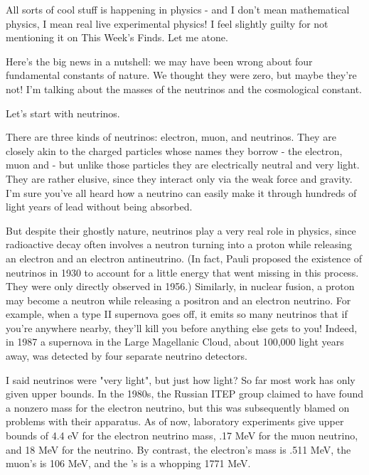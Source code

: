


All sorts of cool stuff is happening in physics - and I don't mean
mathematical physics, I mean real live experimental physics!  I feel
slightly guilty for not mentioning it on This Week's Finds.  Let me
atone.

Here's the big news in a nutshell: we may have been wrong about four
fundamental constants of nature.  We thought they were zero, but maybe
they're not!  I'm talking about the masses of the neutrinos and the
cosmological constant.   

Let's start with neutrinos.

There are three kinds of neutrinos: electron, muon, and \tau  neutrinos.
They are closely akin to the charged particles whose names they borrow -
the electron, muon and \tau  - but unlike those particles they are
electrically neutral and very light.  They are rather elusive, since
they interact only via the weak force and gravity.  I'm sure you've all
heard how a neutrino can easily make it through hundreds of light years
of lead without being absorbed.  

But despite their ghostly nature, neutrinos play a very real role in
physics, since radioactive decay often involves a neutron turning into a
proton while releasing an electron and an electron antineutrino.  (In
fact, Pauli proposed the existence of neutrinos in 1930 to account for a
little energy that went missing in this process.  They were only
directly observed in 1956.)  Similarly, in nuclear fusion, a proton may
become a neutron while releasing a positron and an electron neutrino.  
For example, when a type II supernova goes off, it emits so many
neutrinos that if you're anywhere nearby, they'll kill you before
anything else gets to you!  Indeed, in 1987 a supernova in the Large
Magellanic Cloud, about 100,000 light years away, was detected by four
separate neutrino detectors.  

I said neutrinos were "very light", but just how light?  So far most
work has only given upper bounds.  In the 1980s, the Russian ITEP group
claimed to have found a nonzero mass for the electron neutrino, but this
was subsequently blamed on problems with their apparatus.  As of now,
laboratory experiments give upper bounds of 4.4 eV for the electron
neutrino mass, .17 MeV for the muon neutrino, and 18 MeV for the \tau 
neutrino.  By contrast, the electron's mass is .511 MeV, the muon's is
106 MeV, and the \tau 's is a whopping 1771 MeV.  

